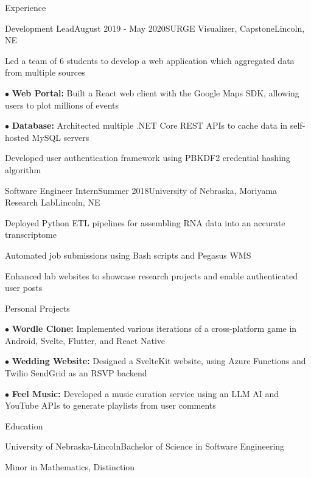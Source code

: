 \documentclass[
	10pt, %
]{article} %
\begin{document}
\begin{rSection}{Experience}
	\begin{rSubsection}{Development Lead}{August 2019 - May 2020}{SURGE Visualizer, Capstone}{Lincoln, NE}
		\item[] Led a team of 6 students to develop a web application which aggregated data from multiple sources
		\item[$\bullet$] \textbf{Web Portal:} Built a React web client with the Google Maps SDK, allowing users to plot millions of events
		\item[$\bullet$] \textbf{Database:} Architected multiple .NET Core REST APIs to cache data in self-hosted MySQL servers
		\item Developed user authentication framework using PBKDF2 credential hashing algorithm
	\end{rSubsection}

	\begin{rSubsection}{Software Engineer Intern}{Summer 2018}{University of Nebraska, Moriyama Research Lab}{Lincoln, NE}
		\item Deployed Python ETL pipelines for assembling RNA data into an accurate transcriptome
		\item Automated job submissions using Bash scripts and Pegasus WMS
		\item Enhanced lab websites to showcase research projects and enable authenticated user posts
	\end{rSubsection}

\end{rSection}

\begin{rSection}{Personal Projects}

	\begin{rSubsection}{}{}{}{}
		\item[$\bullet$] \textbf{Wordle Clone:} Implemented various iterations of a cross-platform game in Android, Svelte, Flutter, and React Native
	\end{rSubsection}

	\begin{rSubsection}{}{}{}{}
		\item[$\bullet$] \textbf{Wedding Website:} Designed a SvelteKit website, using Azure Functions and Twilio SendGrid as an RSVP backend
	\end{rSubsection}

	\begin{rSubsection}{}{}{}{}
		\item[$\bullet$] \textbf{Feel Music:} Developed a music curation service using an LLM AI and YouTube APIs to generate playlists from user comments
	\end{rSubsection}

\end{rSection}

\begin{rSection}{Education}
	\begin{rSubsection}{University of Nebraska-Lincoln}{}{Bachelor of Science in Software Engineering}{}
		\item[] Minor in Mathematics, Distinction
	\end{rSubsection}
\end{rSection}
\end{document}
